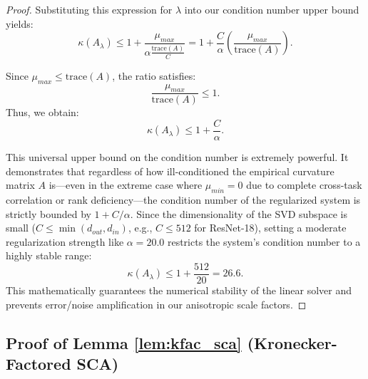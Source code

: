 \documentclass{article}
\theoremstyle{plain}
\theoremstyle{definition}
\theoremstyle{remark}
\begin{document}
\begin{proof}
Substituting this expression for $\lambda$ into our condition number upper bound yields:
\begin{equation}
    \kappa(A_{\lambda}) \le 1 + \frac{\mu_{max}}{\alpha \frac{\text{trace}(A)}{C}} = 1 + \frac{C}{\alpha} \left( \frac{\mu_{max}}{\text{trace}(A)} \right).
\end{equation}

Since $\mu_{max} \le \text{trace}(A)$, the ratio satisfies:
\begin{equation}
    \frac{\mu_{max}}{\text{trace}(A)} \le 1.
\end{equation}
Thus, we obtain:
\begin{equation}
    \kappa(A_{\lambda}) \le 1 + \frac{C}{\alpha}.
\end{equation}

This universal upper bound on the condition number is extremely powerful. It demonstrates that regardless of how ill-conditioned the empirical curvature matrix $A$ is—even in the extreme case where $\mu_{min} = 0$ due to complete cross-task correlation or rank deficiency—the condition number of the regularized system is strictly bounded by $1 + C/\alpha$. 
Since the dimensionality of the SVD subspace is small ($C \le \min(d_{out}, d_{in})$, e.g., $C \le 512$ for ResNet-18), setting a moderate regularization strength like $\alpha = 20.0$ restricts the system's condition number to a highly stable range:
\begin{equation}
    \kappa(A_{\lambda}) \le 1 + \frac{512}{20} = 26.6.
\end{equation}
This mathematically guarantees the numerical stability of the linear solver and prevents error/noise amplification in our anisotropic scale factors.
\end{proof}

\subsection{Proof of Lemma \ref{lem:kfac_sca} (Kronecker-Factored SCA)}
\label{sec:appendix_kfac}
\end{document}
